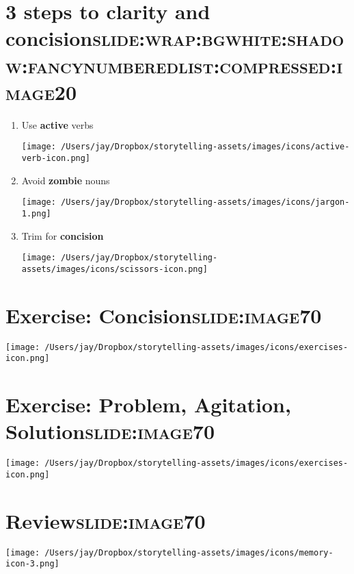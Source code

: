 \documentclass[12pt]{article}
\begin{document}
\section[3 steps to \textbf{clarity} and \textbf{concision}]{3 steps to \textbf{clarity} and \textbf{concision}\hfill{}\textsc{slide:wrap:bgwhite:shadow:fancynumberedlist:compressed:image20}}
\label{sec:org7708d95}
\begin{enumerate}
\item Use \textbf{active} verbs \begin{center}
\texttt{[image: /Users/jay/Dropbox/storytelling-assets/images/icons/active-verb-icon.png]}
\end{center}
\item Avoid \textbf{zombie} nouns \begin{center}
\texttt{[image: /Users/jay/Dropbox/storytelling-assets/images/icons/jargon-1.png]}
\end{center}
\item Trim for \textbf{concision} \begin{center}
\texttt{[image: /Users/jay/Dropbox/storytelling-assets/images/icons/scissors-icon.png]}
\end{center}
\end{enumerate}

\section[Exercise: \textbf{Concision}]{Exercise: \textbf{Concision}\hfill{}\textsc{slide:image70}}
\label{sec:org3628aed}
\begin{center}
\texttt{[image: /Users/jay/Dropbox/storytelling-assets/images/icons/exercises-icon.png]}
\end{center}


\section[Exercise: Problem, Agitation, Solution]{Exercise: Problem, Agitation, Solution\hfill{}\textsc{slide:image70}}
\label{sec:org6051bdc}
\begin{center}
\texttt{[image: /Users/jay/Dropbox/storytelling-assets/images/icons/exercises-icon.png]}
\end{center}

\section[Review]{Review\hfill{}\textsc{slide:image70}}
\label{sec:org3fb65b9}
\begin{center}
\texttt{[image: /Users/jay/Dropbox/storytelling-assets/images/icons/memory-icon-3.png]}
\end{center}
\end{document}
